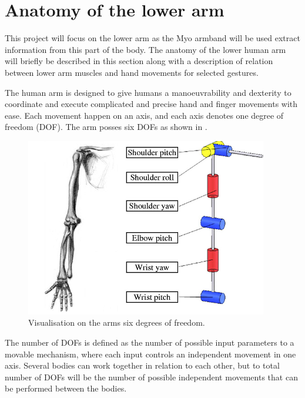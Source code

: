 \section{Anatomy of the lower arm}


This project will focus on the lower arm as the Myo armband will be used extract information from this part of the body. The anatomy of the lower human arm will briefly be described in this section along with a description of relation between lower arm muscles and hand movements for selected gestures. 

The human arm is designed to give humans a manoeuvrability and dexterity to coordinate and execute complicated and precise hand and finger movements with ease. Each movement happen on an axis, and each axis denotes one degree of freedom (DOF). The arm posses six DOFs as shown in .

\begin{figure}[H]                                         %
	\includegraphics[width=.4\textwidth]{figures/anatomy/human_arm_dof}  %
	\caption{Visualisation on the arms six degrees of freedom. \cite{http://reset.etsii.upm.es/en/projects/robotic-arm/}}
	\label{fig:armDOF}  %
\end{figure}

The number of DOFs is defined as the number of possible input parameters to a movable mechanism, where each input controls an independent movement in one axis. Several bodies can work together in relation to each other, but to total number of DOFs will be the number of possible independent movements that can be performed between the bodies. \cite{dicker2003}

